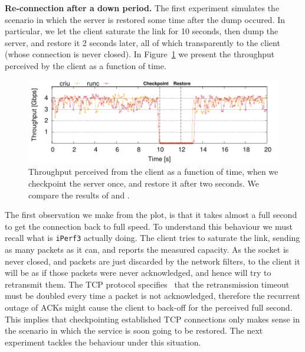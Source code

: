 \textbf{Re-connection after a down period.}
The first experiment simulates the scenario in which the server is restored some time after the dump occured.
In particular, we let the client saturate the link for 10 seconds, then dump the server, and restore it 2 seconds later, all of which transparently to the client (whose connection is never closed).
In Figure~\ref{fig:evaluation-downtime} we present the throughput perceived by the client as a function of time. 
\begin{figure}[h!]
    \centering
    \includegraphics[width=\linewidth]{./images/tcp_established_downtime_microbenchmark.pdf}
    \caption{Throughput perceived from the client as a function of time, when we checkpoint the server once, and restore it after two seconds. We compare the results of \criu and \runc. \label{fig:evaluation-downtime}}
\end{figure}
The first observation we make from the plot, is that it takes almost a full second to get the connection back to full speed.
To understand this behaviour we must recall what is \texttt{iPerf3} actually doing.
The client tries to saturate the link, sending as many packets as it can, and reports the measured capacity.
As the socket is never closed, and packets are just discarded by the network filters, to the client it will be as if those packets were never acknowledged, and hence will try to retransmit them.
The TCP protocol specifies~\cite{tcp-rfc} that the retransmission timeout must be doubled every time a packet is not acknowledged, therefore the recurrent outage of ACKs might cause the client to back-off for the perceived full second.
This implies that checkpointing established TCP connections only makes sense in the scenario in which the service is soon going to be restored.
The next experiment tackles the behaviour under this situation.

